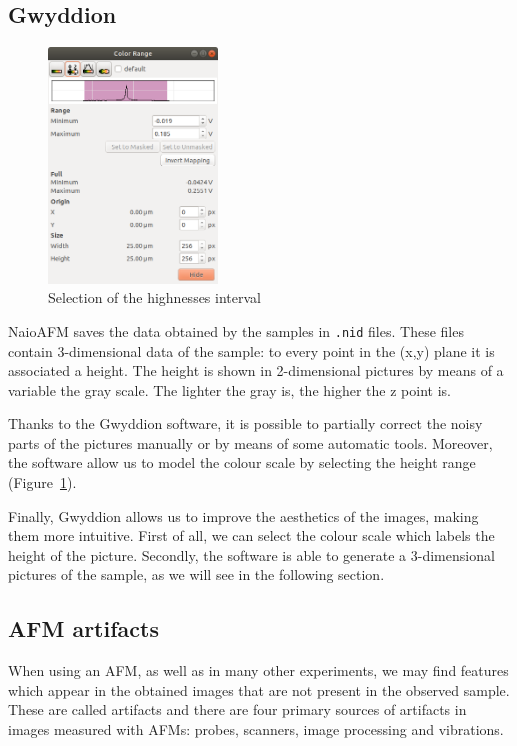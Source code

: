\documentclass[11pt,a4paper]{article}
\begin{document}
\subsection{Gwyddion}

\begin{figure}[ht]
\centering
\includegraphics[width=0.4\textwidth]{scale_selection}
\caption{Selection of the highnesses interval}
\label{fig:scale_selection}
\end{figure}

NaioAFM saves the data obtained by the samples in \texttt{.nid} files. These files contain 3-dimensional data of the sample: to every point in the (x,y) plane it is associated a height. The height is shown in 2-dimensional pictures {\color{red}by means of a variable the gray scale}. The lighter the gray is, the higher the z point is.

Thanks to the Gwyddion software, it is possible to partially correct the noisy parts of the pictures manually or by means of some automatic tools. Moreover, the software allow us to model the colour scale by selecting the height range (Figure~\ref{fig:scale_selection}).

Finally, Gwyddion allows us to improve the aesthetics of the images, making them more intuitive. First of all, we can select the colour scale which labels the height of the picture. Secondly, the software is able to generate a 3-dimensional pictures of the sample, as we will see in the following section.

\subsection{AFM artifacts}
When using an AFM, as well as in many other experiments, we may find features which appear in the obtained images that are not present in the observed sample. These are called artifacts \cite{artifacts} and there are four primary sources of artifacts in images measured with AFMs: probes, scanners, image processing and vibrations.
\end{document}

